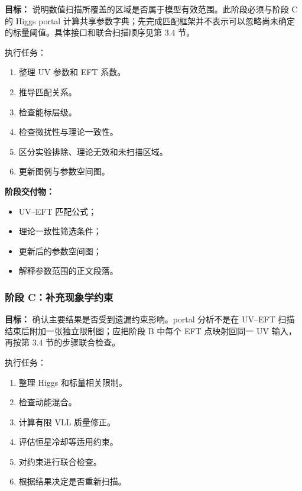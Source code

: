 \documentclass[
]{article}
\providecommand{\tightlist}{%
  \setlength{\itemsep}{0pt}\setlength{\parskip}{0pt}}
\begin{document}
\textbf{目标：}
说明数值扫描所覆盖的区域是否属于模型有效范围。此阶段必须与阶段 C 的
Higgs portal
计算共享参数字典；先完成匹配框架并不表示可以忽略尚未确定的标量阈值。具体接口和联合扫描顺序见第
3.4 节。

执行任务：

\begin{enumerate}
\def\labelenumi{\arabic{enumi}.}
\tightlist
\item
  整理 UV 参数和 EFT 系数。
\item
  推导匹配关系。
\item
  检查能标层级。
\item
  检查微扰性与理论一致性。
\item
  区分实验排除、理论无效和未扫描区域。
\item
  更新图例与参数空间图。
\end{enumerate}

\textbf{阶段交付物：}

\begin{itemize}
\tightlist
\item
  UV--EFT 匹配公式；
\item
  理论一致性筛选条件；
\item
  更新后的参数空间图；
\item
  解释参数范围的正文段落。
\end{itemize}

\subsubsection{阶段
C：补充现象学约束}\label{ux9636ux6bb5-cux8865ux5145ux73b0ux8c61ux5b66ux7ea6ux675f}

\textbf{目标：} 确认主要结果是否受到遗漏约束影响。portal 分析不是在
UV--EFT 扫描结束后附加一张独立限制图；应把阶段 B 中每个 EFT 点映射回同一
UV 输入，再按第 3.4 节的步骤联合检查。

执行任务：

\begin{enumerate}
\def\labelenumi{\arabic{enumi}.}
\tightlist
\item
  整理 Higgs 和标量相关限制。
\item
  检查动能混合。
\item
  计算有限 VLL 质量修正。
\item
  评估恒星冷却等适用约束。
\item
  对约束进行联合检查。
\item
  根据结果决定是否重新扫描。
\end{enumerate}
\end{document}
